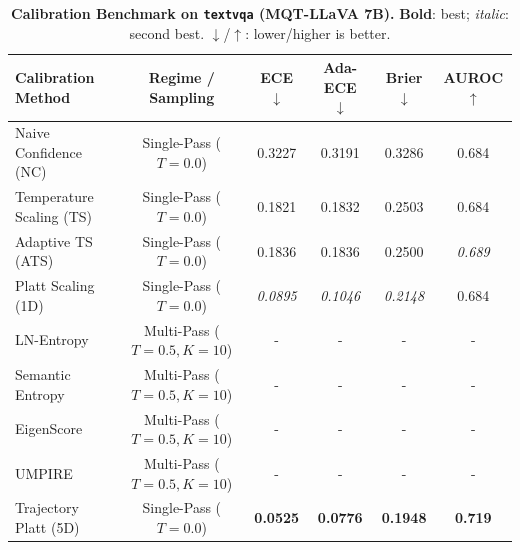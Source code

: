 \begin{table}[t]
\setlength{\tabcolsep}{4pt}
\renewcommand{\arraystretch}{1.05}
\centering
\footnotesize
\begin{tabular}{lccccc}
\toprule
\textbf{Calibration Method} & \textbf{Regime / Sampling} & \textbf{ECE} $\downarrow$ & \textbf{Ada-ECE} $\downarrow$ & \textbf{Brier} $\downarrow$ & \textbf{AUROC} $\uparrow$ \\
\midrule
Naive Confidence (NC) & Single-Pass ($T = 0.0$) & 0.3227 & 0.3191 & 0.3286 & 0.684 \\
Temperature Scaling (TS) & Single-Pass ($T = 0.0$) & 0.1821 & 0.1832 & 0.2503 & 0.684 \\
Adaptive TS (ATS) & Single-Pass ($T = 0.0$) & 0.1836 & 0.1836 & 0.2500 & \textit{0.689} \\
Platt Scaling (1D) & Single-Pass ($T = 0.0$) & \textit{0.0895} & \textit{0.1046} & \textit{0.2148} & 0.684 \\
LN-Entropy & Multi-Pass ($T = 0.5, K = 10$) & - & - & - & - \\
Semantic Entropy & Multi-Pass ($T = 0.5, K = 10$) & - & - & - & - \\
EigenScore & Multi-Pass ($T = 0.5, K = 10$) & - & - & - & - \\
UMPIRE & Multi-Pass ($T = 0.5, K = 10$) & - & - & - & - \\
Trajectory Platt (5D) & Single-Pass ($T = 0.0$) & \textbf{0.0525} & \textbf{0.0776} & \textbf{0.1948} & \textbf{0.719} \\
\bottomrule
\end{tabular}
\caption{\textbf{Calibration Benchmark on \texttt{textvqa} (MQT-LLaVA 7B).} \textbf{Bold}: best; \textit{italic}: second best. $\downarrow$/$\uparrow$: lower/higher is better.}
\label{tab:benchmark_mqt_textvqa}
\end{table}
